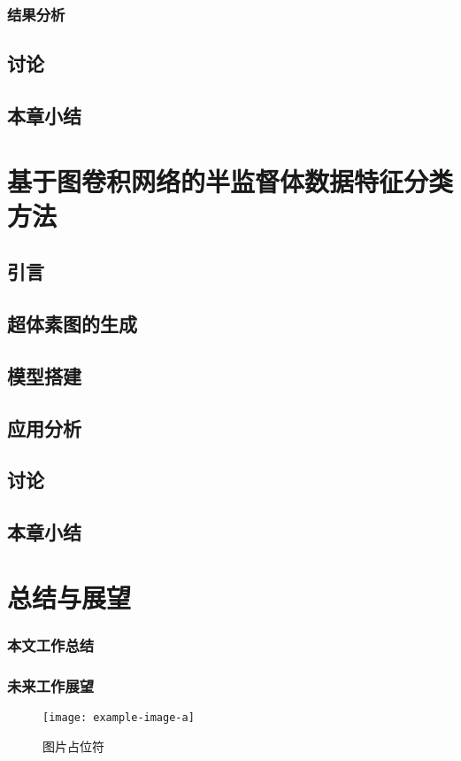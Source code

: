 \subsection{结果分析}
\section{讨论}
\section{本章小结}

\chapter{基于图卷积网络的半监督体数据特征分类方法}
\section{引言}
\section{超体素图的生成}
\section{模型搭建}
\section{应用分析}
\section{讨论}
\section{本章小结}


\chapter{总结与展望}
\subsection{本文工作总结}
\subsection{未来工作展望}

\begin{figure}[htbp]
    \centering
    \texttt{[image: example-image-a]}
    \caption{\label{fig:fig-placeholder}图片占位符}
\end{figure}
